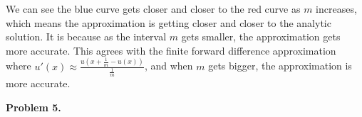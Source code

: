 \documentclass{article}
\begin{document}
\begin{enumerate}[label=(\alph*)]
    We can see the blue curve gets closer and closer to the red curve as $m$ increases, which means the approximation is getting closer and closer to the analytic solution.
    It is because as the interval $m$ gets smaller, the approximation gets more accurate.
    This agrees with the finite forward difference approximation where $u'(x) \approx \frac{u(x+\frac{1}{m}-u(x))}{\frac{1}{m}}$, and when $m$ gets bigger, the approximation is more accurate.
\end{enumerate}
\bigbreak

\textbf{Problem 5.}
\end{document}
